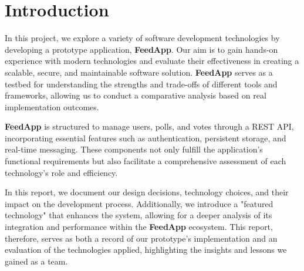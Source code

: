 \section{Introduction}
\label{introduction}

In this project, we explore a variety of software development technologies by developing a prototype application, \textbf{FeedApp}. Our aim is to gain hands-on experience with modern technologies and evaluate their effectiveness in creating a scalable, secure, and maintainable software solution. \textbf{FeedApp} serves as a testbed for understanding the strengths and trade-offs of different tools and frameworks, allowing us to conduct a comparative analysis based on real implementation outcomes.

\textbf{FeedApp} is structured to manage users, polls, and votes through a REST API, incorporating essential features such as authentication, persistent storage, and real-time messaging. These components not only fulfill the application's functional requirements but also facilitate a comprehensive assessment of each technology's role and efficiency.

In this report, we document our design decisions, technology choices, and their impact on the development process. Additionally, we introduce a "featured technology" that enhances the system, allowing for a deeper analysis of its integration and performance within the \textbf{FeedApp} ecosystem. This report, therefore, serves as both a record of our prototype's implementation and an evaluation of the technologies applied, highlighting the insights and lessons we gained as a team.

\newpage %